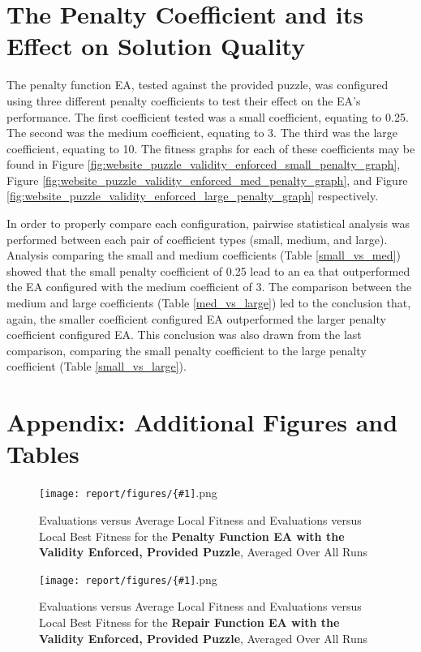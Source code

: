 \documentclass[11pt]{article}
\newcommand{\fitnessplotcaption}[1]{\caption{Evaluations versus Average Local Fitness and Evaluations versus 
    Local Best Fitness for the \textbf{{#1}}, Averaged Over All Runs}}
\newcommand{\addgraphic}[1]{\centerline{\texttt{[image: report/figures/\{\#1]}.png}}}
\begin{document}
\section{The Penalty Coefficient and its Effect on Solution Quality}

The penalty function EA, tested against the provided puzzle, was configured using three different penalty coefficients
to test their effect on the EA's performance. The first coefficient tested was a small coefficient, equating to 0.25. The
second was the medium coefficient, equating to 3. The third was the large coefficient, equating to 10. The fitness graphs for
each of these coefficients may be found in Figure \ref{fig:website_puzzle_validity_enforced_small_penalty_graph},
Figure \ref{fig:website_puzzle_validity_enforced_med_penalty_graph}, and Figure 
\ref{fig:website_puzzle_validity_enforced_large_penalty_graph} respectively.

In order to properly compare each configuration, pairwise statistical analysis was performed between each pair of coefficient types
(small, medium, and large). Analysis comparing the small and medium coefficients (Table \ref{small_vs_med}) showed that the small
penalty coefficient of 0.25 lead to an ea that outperformed the EA configured with the medium coefficient of 3. The comparison between
the medium and large coefficients (Table \ref{med_vs_large}) led to the conclusion that, again, the smaller coefficient configured EA 
outperformed the larger penalty coefficient configured EA. This conclusion was also drawn from the last comparison, comparing the small
penalty coefficient to the large penalty coefficient (Table \ref{small_vs_large}).


\section{Appendix: Additional Figures and Tables}

\begin{figure}
    \addgraphic{website_puzzle_validity_enforced_graph}
    \fitnessplotcaption{Penalty Function EA with the Validity Enforced, Provided Puzzle}
    \label{fig:website_puzzle_validity_enforced_graph}
\end{figure}

\begin{figure}
    \addgraphic{website_puzzle_validity_enforced_bonus_graph}
    \fitnessplotcaption{Repair Function EA with the Validity Enforced, Provided Puzzle}
    \label{fig:website_puzzle_validity_enforced_bonus_graph}
\end{figure}
\end{document}

